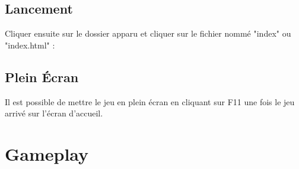 \documentclass{article}
\begin{document}
\subsection{Lancement}
Cliquer ensuite sur le dossier apparu et cliquer sur le fichier nomm\'e "index" ou "index.html" :
\vspace{0.5cm}\\
\subsection{Plein \'Ecran}
Il est possible de mettre le jeu en plein \'ecran en cliquant sur F11 une fois le jeu arriv\'e sur l'\'ecran d'accueil. 

\newpage
\section{Gameplay}
\end{document}
